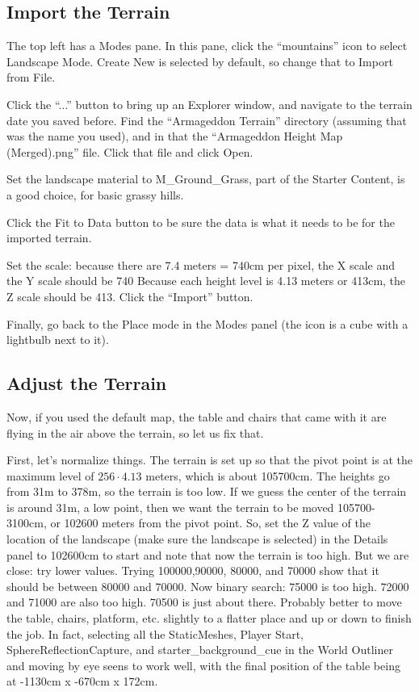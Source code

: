 \documentclass[letter,12pt]{article}
\begin{document}
\subsection{Import the Terrain}
The top left has a Modes pane.  In this pane, click the “mountains” icon to select Landscape Mode.  Create New is selected by default, so change that to Import from File.

Click the “...” button to bring up an Explorer window, and navigate to the terrain date you saved before.  Find the “Armageddon Terrain” directory (assuming that was the name you used), and in that the “Armageddon Height Map (Merged).png” file.  Click that file and click Open.

Set the landscape material to  M\_Ground\_Grass, part of the Starter Content, is a good choice, for basic grassy hills. 

Click the Fit to Data button to be sure the data is what it needs to be for the imported terrain. 

Set the scale:  because there are 7.4 meters = 740cm per pixel, the X scale and the Y scale should be 740  Because each height level is 4.13 meters or 413cm, the Z scale should be 413.  Click the “Import” button.

Finally, go back to the Place mode in the Modes panel (the icon is a cube with a lightbulb next to it).

\subsection{Adjust the Terrain}
Now, if you used the default map, the table and chairs that came with it are flying in the air above the terrain, so let us fix that.

First, let’s normalize things.  The terrain is set up so that the pivot point is at the maximum level of $256\cdot 4.13$ meters, which is about 105700cm.  The heights  go from 31m to 378m, so the terrain is too low.  If we guess the center of the terrain is around 31m, a low point, then we want the terrain to be moved 105700-3100cm, or 102600 meters from the pivot point.  So, set the Z value of the location of the landscape (make sure the landscape is selected) in the Details panel to 102600cm to start and note that now the terrain is too high.  But we are close: try lower values. Trying 100000,90000, 80000, and 70000 show that it should be between 80000 and 70000.  Now binary search: 75000 is too high.   72000 and 71000 are also too high.  70500 is just about there.  Probably better to move the table, chairs, platform, etc. slightly to a flatter place and up or down to finish the job.  In fact, selecting all the StaticMeshes, Player Start, SphereReflectionCapture, and starter\_background\_cue  in the World Outliner and moving by eye seens to work well, with the final position of the table being at -1130cm x -670cm x 172cm.
\end{document}
